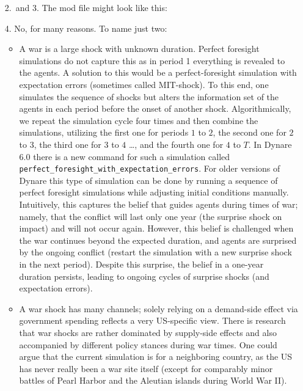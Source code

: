 \begin{enumerate}

\item[2.~and 3.]
The mod file might look like this:


\item[4.]
No, for many reasons. To name just two:

\begin{itemize}

\item
A war is a large shock with unknown duration.
Perfect foresight simulations do not capture this as in period 1 everything is revealed to the agents.
A solution to this would be a perfect-foresight simulation with expectation errors (sometimes called MIT-shock).
To this end, one simulates the sequence of shocks
  but alters the information set of the agents in each period
  before the onset of another shock.
Algorithmically, we repeat the simulation cycle four times
  and then combine the simulations,
  utilizing the first one for periods \(1\) to \(2\),
  the second one for \(2\) to \(3\), the third one for \(3\) to \(4\) \ldots,
  and the fourth one for \(4\) to \(T\).
In Dynare 6.0 there is a new command for such a simulation called
  \texttt{perfect{\_}foresight{\_}with{\_}expectation{\_}errors}.
For older versions of Dynare this type of simulation can be done
  by running a sequence of perfect foresight simulations
  while adjusting initial conditions manually.
Intuitively, this captures the belief that guides agents during times of war;
  namely, that the conflict will last only one year
  (the surprise shock on impact) and will not occur again.
However, this belief is challenged when the war continues beyond the expected duration,
  and agents are surprised by the ongoing conflict
  (restart the simulation with a new surprise shock in the next period).
Despite this surprise, the belief in a one-year duration persists,
  leading to ongoing cycles of surprise shocks (and expectation errors).

\item
A war shock has many channels;
  solely relying on a demand-side effect via government spending
  reflects a very US-specific view.
There is research that war shocks are rather dominated by supply-side effects
  and also accompanied by different policy stances during war times.
One could argue that the current simulation is for a neighboring country,
  as the US has never really been a war site itself
  (except for comparably minor battles of Pearl Harbor and the Aleutian islands
  during World War II).
\end{itemize}

\end{enumerate}
